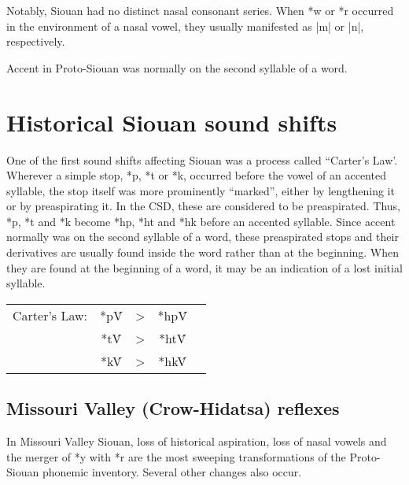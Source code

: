 \documentclass[output=paper]{LSP/langsci}
\begin{document}
Notably, Siouan had no distinct nasal consonant series.  When *w or *r occurred in the environment of a nasal vowel, they usually manifested as |m| or |n|, respectively.

Accent in Proto-Siouan was normally on the second syllable of a word.

\section{Historical Siouan sound shifts}

One of the first sound shifts affecting Siouan was a process called ``Carter's Law'.  Wherever a simple stop, *p, *t or *k, occurred before the vowel of an accented syllable, the stop itself was more prominently ``marked'', either by lengthening it or by preaspirating it.  In the CSD, these are considered to be preaspirated.  Thus, *p, *t and *k become *hp, *ht and *hk before an accented syllable.  Since accent normally was on the second syllable of a word, these preaspirated stops and their derivatives are usually found inside the word rather than at the beginning.  When they are found at the beginning of a word, it may be an indication of a lost initial syllable.
\begin{center}
\begin{tabular}[t]{c c c c c }

Carter's Law: & *p\'V & > & *hp\'V  \\

& *t\'V & >  & *ht\'V \\

&  *k\'V & >  & *hk\'V\\
\end{tabular}
\end{center}

\subsection{Missouri Valley (Crow-Hidatsa) reflexes}

In Missouri Valley Siouan, loss of historical aspiration, loss of nasal vowels and the merger of *y with *r are the most sweeping transformations of the Proto-Siouan phonemic inventory.  Several other changes also occur.
\end{document}
